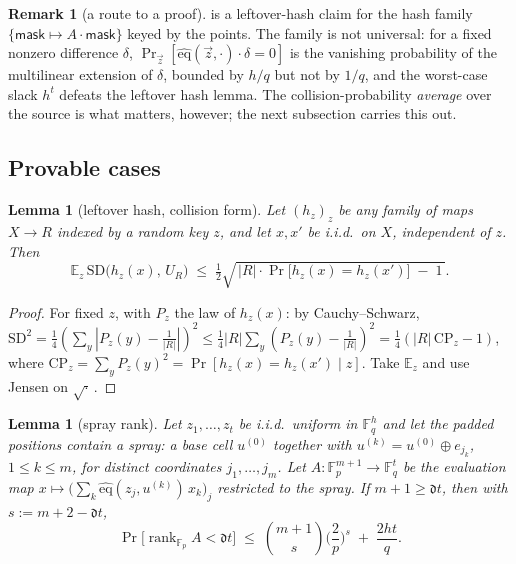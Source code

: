 \documentclass{article}
\newcommand{\Fp}{\mathbb{F}_p}
\newcommand{\Fq}{\mathbb{F}_q}
\newcommand{\extdeg}{\mathfrak{d}}
\newcommand{\eqf}{\widehat{\mathrm{eq}}}
\newtheorem{lemma}[theorem]{Lemma}
\theoremstyle{definition}
\newtheorem{remark}[theorem]{Remark}
\begin{document}
\begin{remark}[a route to a proof]\label{rem:lhl}
 is a leftover-hash claim for the hash family $\{ \mathsf{mask} \mapsto A \cdot \mathsf{mask} \}$ keyed by the points. The family is not universal: for a fixed nonzero difference $\delta$, $\Pr_{\vec z}[\eqf(\vec z, \cdot) \cdot \delta = 0]$ is the vanishing probability of the multilinear extension of $\delta$, bounded by $h/q$ but not by $1/q$, and the worst-case slack $h^t$ defeats the leftover hash lemma. The collision-probability \emph{average} over the source is what matters, however; the next subsection carries this out.
\end{remark}

\subsection{Provable cases}\label{sec:linear-thms}

\begin{lemma}[leftover hash, collision form]\label{lem:lhl}
Let $(h_z)_z$ be any family of maps $X \to R$ indexed by a random key $z$, and let $x, x'$ be i.i.d.\ on $X$, independent of $z$. Then
\[
\mathbb{E}_z\, \mathrm{SD}\big(h_z(x),\, U_R\big) \;\leq\; \tfrac{1}{2}\sqrt{\,|R| \cdot \Pr\big[h_z(x) = h_z(x')\big] \;-\; 1\,} .
\]
\end{lemma}

\begin{proof}
For fixed $z$, with $P_z$ the law of $h_z(x)$: by Cauchy--Schwarz, $\mathrm{SD}^2 = \tfrac14 (\sum_y |P_z(y) - \tfrac{1}{|R|}|)^2 \leq \tfrac14 |R| \sum_y (P_z(y) - \tfrac1{|R|})^2 = \tfrac14 (|R|\, \mathrm{CP}_z - 1)$, where $\mathrm{CP}_z = \sum_y P_z(y)^2 = \Pr[h_z(x) = h_z(x') \mid z]$. Take $\mathbb{E}_z$ and use Jensen on $\sqrt{\cdot}\,$.
\end{proof}

\begin{lemma}[spray rank]\label{lem:spray}
Let $z_1, \dots, z_t$ be i.i.d.\ uniform in $\Fq^h$ and let the padded positions contain a \emph{spray}: a base cell $u^{(0)}$ together with $u^{(k)} = u^{(0)} \oplus e_{j_k}$, $1 \leq k \leq m$, for distinct coordinates $j_1, \dots, j_m$. Let $A : \Fp^{m+1} \to \Fq^t$ be the evaluation map $x \mapsto \big(\sum_k \eqf(z_j, u^{(k)})\, x_k\big)_j$ restricted to the spray. If $m + 1 \geq \extdeg t$, then with $s := m + 2 - \extdeg t$,
\[
\Pr\big[\operatorname{rank}_{\Fp} A < \extdeg t\big] \;\leq\; \binom{m+1}{s} \Big(\frac{2}{p}\Big)^{s} \;+\; \frac{2ht}{q} .
\]
\end{lemma}
\end{document}
